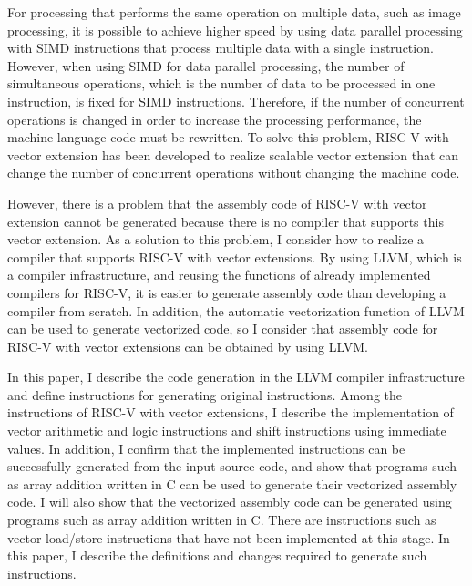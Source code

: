For processing that performs the same operation on multiple data, such as image processing, it is possible to achieve higher speed by using data parallel processing with SIMD instructions that process multiple data with a single instruction.
However, when using SIMD for data parallel processing, the number of simultaneous operations, which is the number of data to be processed in one instruction, is fixed for SIMD instructions. Therefore, if the number of concurrent operations is changed in order to increase the processing performance, the machine language code must be rewritten.
To solve this problem, RISC-V with vector extension has been developed to realize scalable vector extension that can change the number of concurrent operations without changing the machine code.

However, there is a problem that the assembly code of RISC-V with vector extension cannot be generated because there is no compiler that supports this vector extension. As a solution to this problem, I consider how to realize a compiler that supports RISC-V with vector extensions. By using LLVM, which is a compiler infrastructure, and reusing the functions of already implemented compilers for RISC-V, it is easier to generate assembly code than developing a compiler from scratch. In addition, the automatic vectorization function of LLVM can be used to generate vectorized code, so I consider that assembly code for RISC-V with vector extensions can be obtained by using LLVM.

In this paper, I describe the code generation in the LLVM compiler infrastructure and define instructions for generating original instructions. Among the instructions of RISC-V with vector extensions, I describe the implementation of vector arithmetic and logic instructions and shift instructions using immediate values.
In addition, I confirm that the implemented instructions can be successfully generated from the input source code, and show that programs such as array addition written in C can be used to generate their vectorized assembly code.
I will also show that the vectorized assembly code can be generated using programs such as array addition written in C. There are instructions such as vector load/store instructions that have not been implemented at this stage. In this paper, I describe the definitions and changes required to generate such instructions.